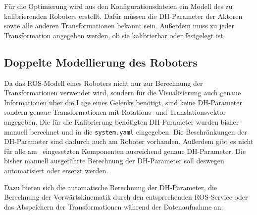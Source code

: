 \label{sec:Optimierung}

Für die Optimierung wird aus den Konfigurationsdateien ein Modell des zu 
kalibrierenden Roboters erstellt. Dafür müssen die \ac{DH-Parameter} der Aktoren
sowie alle anderen Transformationen bekannt sein. Außerdem muss zu jeder Transformation 
angegeben werden, ob sie kalibrierbar oder festgelegt ist.

\subsection{Doppelte Modellierung des Roboters} %
\label{sub:doppelte modellierung}


Da das \ac{ROS}-Modell eines Roboters nicht nur zur Berechnung der 
Transformationen verwendet wird, sondern für die Visualisierung auch genaue
Informationen über die Lage eines Gelenks benötigt, sind keine \ac{DH-Parameter} sondern
genaue Transformationen mit Rotations- und Translationsvektor angegeben. Die für die
Kalibrierung benötigten \ac{DH-Parameter} wurden bisher manuell berechnet und
in die \texttt{system.yaml} eingegeben. Die Beschränkungen der \ac{DH-Parameter}
sind dadurch auch am Roboter vorhanden. Außerdem gibt es nicht für alle am \cob\ 
eingesetzten Komponenten ausreichend genaue \ac{DH-Parameter}. Die bisher manuell
ausgeführte Berechnung der \ac{DH-Parameter} soll deswegen automatisiert oder
ersetzt werden.

Dazu bieten sich die automatische 
Berechnung der \ac{DH-Parameter}, die Berechnung der Vorwärtskinematik 
durch den entsprechenden \ac{ROS}-Service oder das Abspeichern 
der Transformationen während der Datenaufnahme an:

